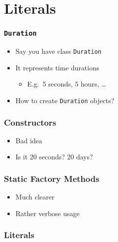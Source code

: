 \section{Literals}
\frame{\tableofcontents[currentsection]}

\begin{frame}
  \frametitle{\texttt{Duration}}
  \begin{itemize}
    \item Say you have class \texttt{Duration}
    \item It represents time durations
          \begin{itemize}
            \item E.g.~5 seconds, 5 hours, \dots
          \end{itemize}
    \item How to create \texttt{Duration} objects?
  \end{itemize}
\end{frame}

\begin{frame}
  \frametitle{Constructors}
  \begin{itemize}
    \item Bad idea
    \item Is it 20 seconds? 20 days?
  \end{itemize}
\end{frame}

\begin{frame}
  \frametitle{Static Factory Methods}
  \begin{itemize}
    \item Much clearer
    \item Rather verbose usage
  \end{itemize}
\end{frame}

\begin{frame}
  \frametitle{Literals}
\end{frame}



